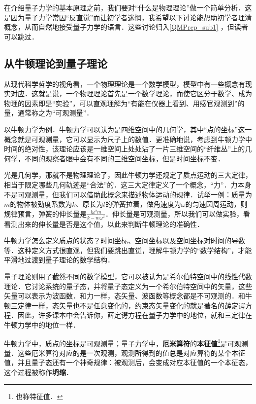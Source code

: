 


在介绍量子力学的基本原理之前，我们要对“什么是物理理论”做一个简单分析．这是因为量子力学常因“反直觉”而让初学者迷惘，我希望以下讨论能帮助初学者理清概念，从而自然地接受量子力学的语言．这些讨论归入\autoref{QMPrcp_sub1} ，但读者可以跳过．

\subsection{从牛顿理论到量子理论}\label{QMPrcp_sub1}

从现代科学哲学的视角看，一个物理理论是一个数学模型，模型中有一些概念有现实对应．这就是说，一个物理理论首先是一个数学理论，而使它区分于数学、成为物理的因素即是“实验”，可以直观理解为“有能在仪器上看到、用感官观测到”的量，通常称之为“可观测量”．

以牛顿力学为例．牛顿力学可以认为是四维空间中的几何学，其中“点的坐标”这一概念就是可观测量，它可以显示为尺子上的数值．更准确地说，考虑到牛顿力学中时间的绝对性，该理论应该是一维空间上处处沾了一片三维空间的“纤维丛”上的几何学，不同的观察者眼中会有不同的三维空间坐标，但是时间坐标不变．

光是几何学，那就不是物理理论了，因此牛顿力学还规定了质点运动的三大定律，相当于限定哪些几何轨迹是“合法”的．这三大定律定义了一个概念，“力”．力本身不是可观测量，但我们可以借助此概念来描述物体运动的规律．试举一例：质量为$m$的物体被劲度系数为$k$、原长为$l$的弹簧拉着，做角速度为$\omega$的匀速圆周运动，则规律预言，弹簧的伸长量是$\frac{l\omega^2m}{k-m\omega^2}$．伸长量是可观测量，所以我们可以做实验，看看测出来的伸长量是否是这个值，以此来判断牛顿理论的准确性．

牛顿力学怎么定义质点的状态？时间坐标、空间坐标以及空间坐标对时间的导数等．这种定义方式很直观，但我们要跳出直觉，理解牛顿力学的“数学结构”，才能平滑地过渡到量子理论的数学结构．

量子理论则用了截然不同的数学模型，它可以被认为是希尔伯特空间中的线性代数理论．它讨论系统的量子态，并将量子态定义为一个希尔伯特空间中的矢量，这些矢量可以表示为波函数．和力一样，态矢量、波函数等概念都是不可观测的．和牛顿三定律一样，态矢量也不是任意变化的，约束态矢量变化的就是著名的薛定谔方程．因此，许多课本中会告诉你，薛定谔方程在量子力学中的地位，就和三定律在牛顿力学中的地位一样．

牛顿力学中，质点的坐标是可观测量；量子力学中，\textbf{厄米算符}的\textbf{本征值}\footnote{也称特征值．}是可观测量．这些厄米算符对应的是一次观测，观测所得到的值总是对应算符的某个本征值，并且量子态还有一个神奇规律：被观测后，会变成对应本征值的一个本征态，这个过程被称作\textbf{坍缩}．



